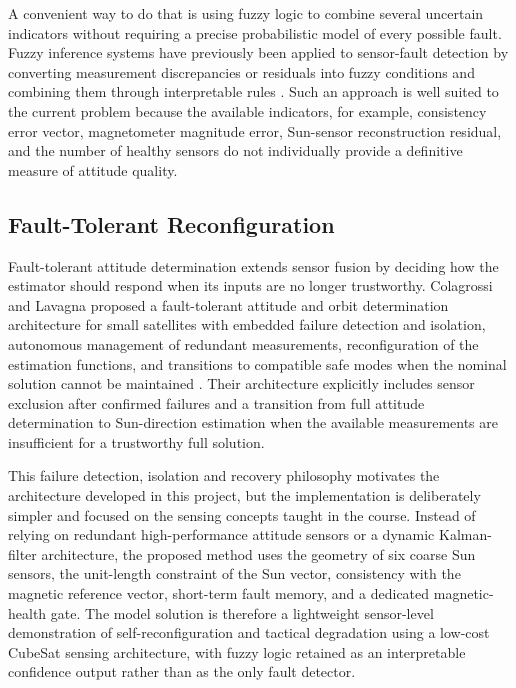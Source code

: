 \documentclass[11pt,a4paper]{article}
\begin{document}
A convenient way to do that is using fuzzy logic to combine several uncertain indicators without requiring a precise probabilistic model of every possible fault. Fuzzy inference systems have previously been applied to sensor-fault detection by converting measurement discrepancies or residuals into fuzzy conditions and combining them through interpretable rules \cite{khan2012fuzzyfault}. Such an approach is well suited to the current problem because the available indicators, for example, consistency error vector, magnetometer magnitude error, Sun-sensor reconstruction residual, and the number of healthy sensors do not individually provide a definitive measure of attitude quality.


\subsection{Fault-Tolerant Reconfiguration}

Fault-tolerant attitude determination extends sensor fusion by deciding how the estimator should respond when its inputs are no longer trustworthy. Colagrossi and Lavagna proposed a fault-tolerant attitude and orbit determination architecture for small satellites with embedded failure detection and isolation, autonomous management of redundant measurements, reconfiguration of the estimation functions, and transitions to compatible safe modes when the nominal solution cannot be maintained \cite{colagrossi2022faulttolerant}. Their architecture explicitly includes sensor exclusion after confirmed failures and a transition from full attitude determination to Sun-direction estimation when the available measurements are insufficient for a trustworthy full solution.

This failure detection, isolation and recovery philosophy motivates the architecture developed in this project, but the implementation is deliberately simpler and focused on the sensing concepts taught in the course. Instead of relying on redundant high-performance attitude sensors or a dynamic Kalman-filter architecture, the proposed method uses the geometry of six coarse Sun sensors, the unit-length constraint of the Sun vector, consistency with the magnetic reference vector, short-term fault memory, and a dedicated magnetic-health gate. The model solution is therefore a lightweight sensor-level demonstration of self-reconfiguration and tactical degradation using a low-cost CubeSat sensing architecture, with fuzzy logic retained as an interpretable confidence output rather than as the only fault detector.
\end{document}
